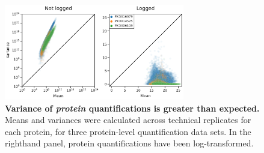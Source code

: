 \documentclass{article}
\begin{document}
\begin{figure}
  \centering
  \includegraphics[width=0.7\textwidth]{figures/mean-variance-protein-figure.pdf}
  \caption{{\bf Variance of \textit{protein} quantifications is greater than expected.} Means and variances were calculated across technical replicates for each protein, for three protein-level quantification data sets. In the righthand panel, protein quantifications have been log-transformed.}
  \label{fig:protein-mean-x-var}
\end{figure} 
\end{document}
